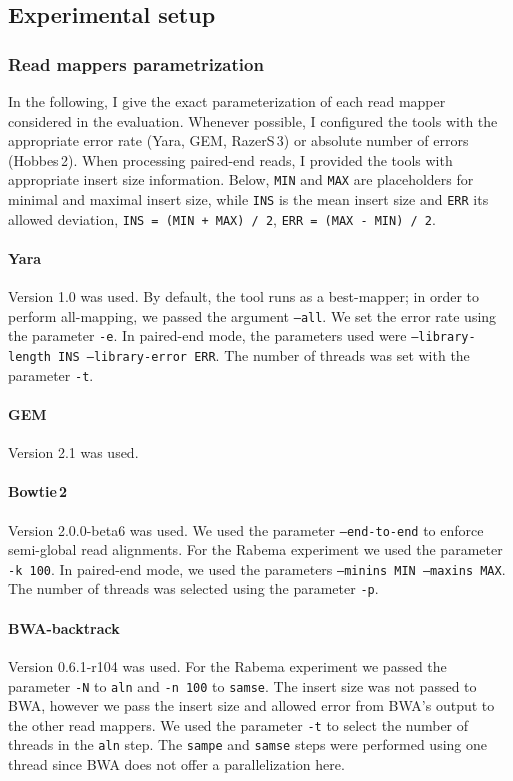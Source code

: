 \subsection{Experimental setup}

\subsubsection{Read mappers parametrization}

In the following, I give the exact parameterization of each read mapper considered in the evaluation.
Whenever possible, I configured the tools with the appropriate error rate (Yara, GEM, RazerS\,3) or absolute number of errors (Hobbes\,2).
When processing paired-end reads, I provided the tools with appropriate insert size information.
Below, \texttt{MIN} and \texttt{MAX} are placeholders for minimal and maximal insert size, while \texttt{INS} is the mean insert size and \texttt{ERR} its allowed deviation, \ie \texttt{INS = (MIN + MAX) / 2}, \texttt{ERR = (MAX - MIN) / 2}.

\paragraph{Yara}
Version 1.0 was used.
By default, the tool runs as a best-mapper; in order to perform all-mapping, we passed the argument \texttt{--all}.
We set the error rate using the parameter \texttt{-e}.
In paired-end mode, the parameters used were \texttt{--library-length INS --library-error ERR}.
The number of threads was set with the parameter \texttt{-t}.

\paragraph{GEM}
Version 2.1 was used.

\paragraph{Bowtie\,2}
Version 2.0.0-beta6 was used.
We used the parameter \texttt{--end-to-end} to enforce semi-global read alignments.
For the Rabema experiment we used the parameter \texttt{-k 100}.
In paired-end mode, we used the parameters \texttt{--minins MIN --maxins MAX}.
The number of threads was selected using the parameter \texttt{-p}.

\paragraph{BWA-backtrack}
Version 0.6.1-r104 was used.
For the Rabema experiment we passed the parameter \texttt{-N} to \texttt{aln} and \texttt{-n 100} to \texttt{samse}.
The insert size was not passed to BWA, however we pass the insert size and allowed error from BWA's output to the other read mappers.
We used the parameter \texttt{-t} to select the number of threads in the \texttt{aln} step.
The {\tt sampe} and {\tt samse} steps were performed using one thread since BWA does not offer a parallelization here.

